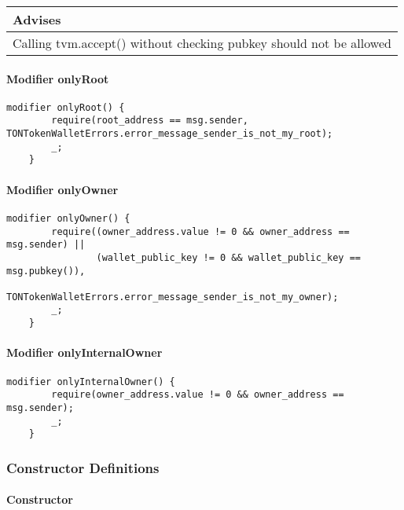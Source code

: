 \ifsoldraft
\noindent\begin{tabular}{|p{12cm}|}\hline
\rowcolor{green}Advises
\\\hline
Calling tvm.accept() without checking pubkey should not be allowed
\\\hline\end{tabular}
\fi

\paragraph{Modifier onlyRoot}


\begin{lstlisting}[firstnumber=598]
    modifier onlyRoot() {
        require(root_address == msg.sender, TONTokenWalletErrors.error_message_sender_is_not_my_root);
        _;
    }
\end{lstlisting}

\paragraph{Modifier onlyOwner}


\begin{lstlisting}[firstnumber=603]
    modifier onlyOwner() {
        require((owner_address.value != 0 && owner_address == msg.sender) ||
                (wallet_public_key != 0 && wallet_public_key == msg.pubkey()),
                TONTokenWalletErrors.error_message_sender_is_not_my_owner);
        _;
    }
\end{lstlisting}

\paragraph{Modifier onlyInternalOwner}


\begin{lstlisting}[firstnumber=610]
    modifier onlyInternalOwner() {
        require(owner_address.value != 0 && owner_address == msg.sender);
        _;
    }
\end{lstlisting}

\subsubsection{Constructor Definitions}


\paragraph{Constructor}

